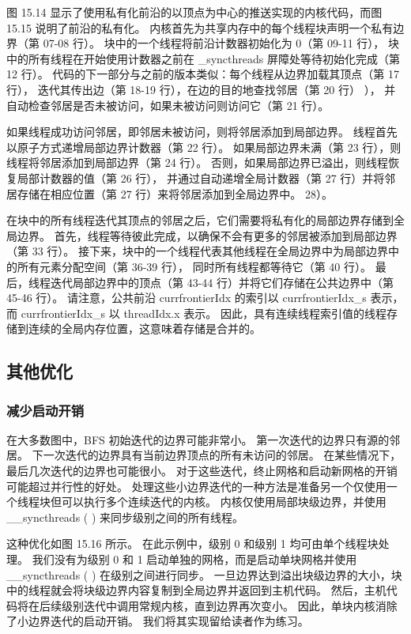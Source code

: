 图 15.14 显示了使用私有化前沿的以顶点为中心的推送实现的内核代码，而图 15.15 说明了前沿的私有化。 
内核首先为共享内存中的每个线程块声明一个私有边界（第 07-08 行）。 
块中的一个线程将前沿计数器初始化为 0（第 09-11 行），
块中的所有线程在开始使用计数器之前在 \_syncthreads 屏障处等待初始化完成（第 12 行）。 
代码的下一部分与之前的版本类似：每个线程从边界加载其顶点（第 17 行），
迭代其传出边（第 18-19 行），在边的目的地查找邻居（第 20 行） ），
并自动检查邻居是否未被访问，如果未被访问则访问它（第 21 行）。

如果线程成功访问邻居，即邻居未被访问，则将邻居添加到局部边界。 线程首先以原子方式递增局部边界计数器（第 22 行）。 
如果局部边界未满（第 23 行），则线程将邻居添加到局部边界（第 24 行）。 
否则，如果局部边界已溢出，则线程恢复局部计数器的值（第 26 行），
并通过自动递增全局计数器（第 27 行）并将邻居存储在相应位置（第 27 行）来将邻居添加到全局边界中。 28）。

在块中的所有线程迭代其顶点的邻居之后，它们需要将私有化的局部边界存储到全局边界。 
首先，线程等待彼此完成，以确保不会有更多的邻居被添加到局部边界（第 33 行）。 
接下来，块中的一个线程代表其他线程在全局边界中为局部边界中的所有元素分配空间（第 36-39 行），
同时所有线程都等待它（第 40 行）。 
最后，线程迭代局部边界中的顶点（第 43-44 行）并将它们存储在公共边界中（第 45-46 行）。 
请注意，公共前沿 currfrontierIdx 的索引以 currfrontierIdx\_s 表示，而 currfrontierIdx\_s 以 threadIdx.x 表示。 
因此，具有连续线程索引值的线程存储到连续的全局内存位置，这意味着存储是合并的。

\subsection{其他优化}
\subsubsection{减少启动开销}
在大多数图中，BFS 初始迭代的边界可能非常小。 第一次迭代的边界只有源的邻居。 
下一次迭代的边界具有当前边界顶点的所有未访问的邻居。 在某些情况下，最后几次迭代的边界也可能很小。 
对于这些迭代，终止网格和启动新网格的开销可能超过并行性的好处。 
处理这些小边界迭代的一种方法是准备另一个仅使用一个线程块但可以执行多个连续迭代的内核。 
内核仅使用局部块级边界，并使用 \_\_syncthreads ( ) 来同步级别之间的所有线程。

这种优化如图 15.16 所示。 在此示例中，级别 0 和级别 1 均可由单个线程块处理。 
我们没有为级别 0 和 1 启动单独的网格，而是启动单块网格并使用 \_\_syncthreads ( ) 在级别之间进行同步。 
一旦边界达到溢出块级边界的大小，块中的线程就会将块级边界内容复制到全局边界并返回到主机代码。 
然后，主机代码将在后续级别迭代中调用常规内核，直到边界再次变小。 
因此，单块内核消除了小边界迭代的启动开销。 我们将其实现留给读者作为练习。

